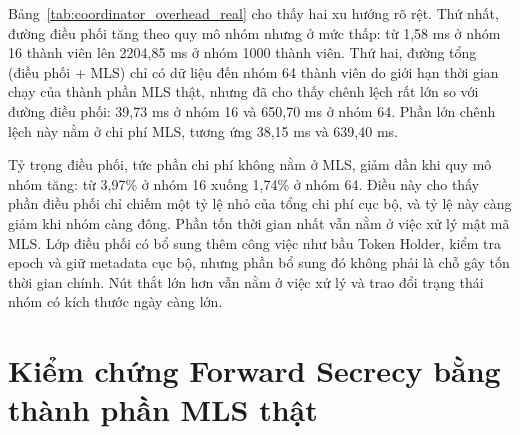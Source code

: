 \documentclass[../DoAn.tex]{subfiles}
\begin{document}
	\begin{table}[htbp]
		\centering
		\caption{Chi phí xử lý cục bộ: Điều phối (giả lập MLS) và Điều phối + MLS (MLS thật)}
		\label{tab:coordinator_overhead_real}
	\end{table}
	
Bảng~\ref{tab:coordinator_overhead_real} cho thấy hai xu hướng rõ rệt. Thứ nhất, đường điều phối tăng theo quy mô nhóm nhưng ở mức thấp: từ 1,58 ms ở nhóm 16 thành viên lên 2204,85 ms ở nhóm 1000 thành viên. Thứ hai, đường tổng (điều phối + MLS) chỉ có dữ liệu đến nhóm 64 thành viên do giới hạn thời gian chạy của thành phần MLS thật, nhưng đã cho thấy chênh lệch rất lớn so với đường điều phối: 39,73 ms ở nhóm 16 và 650,70 ms ở nhóm 64. Phần lớn chênh lệch này nằm ở chi phí MLS, tương ứng 38,15 ms và 639,40 ms.
	
Tỷ trọng điều phối, tức phần chi phí không nằm ở MLS, giảm dần khi quy mô nhóm tăng: từ 3,97\% ở nhóm 16 xuống 1,74\% ở nhóm 64. Điều này cho thấy phần điều phối chỉ chiếm một tỷ lệ nhỏ của tổng chi phí cục bộ, và tỷ lệ này càng giảm khi nhóm càng đông. Phần tốn thời gian nhất vẫn nằm ở việc xử lý mật mã MLS. Lớp điều phối có bổ sung thêm công việc như bầu Token Holder, kiểm tra epoch và giữ metadata cục bộ, nhưng phần bổ sung đó không phải là chỗ gây tốn thời gian chính. Nút thắt lớn hơn vẫn nằm ở việc xử lý và trao đổi trạng thái nhóm có kích thước ngày càng lớn.
	
	\section{Kiểm chứng Forward Secrecy bằng thành phần MLS thật}
	\label{sec:forward_secrecy}
	
\end{document}
